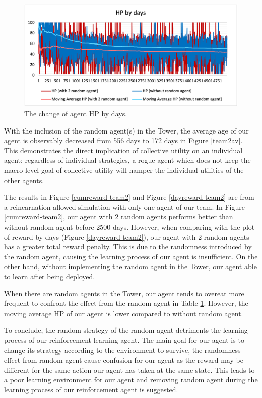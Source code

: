 \begin{figure}
\centering
\includegraphics{004_team_2_agent_design/hpchange}
\caption{The change of agent HP by days.}
\label{hpchange-team2}
\end{figure}

With the inclusion of the random agent(s) in the Tower, the average age of our agent is observably decreased from 556 days to 172 days in Figure \ref{team2av}. This demonstrates the direct implication of collective utility on an individual agent; regardless of individual strategies, a rogue agent which does not keep the macro-level goal of collective utility will hamper the individual utilities of the other agents. 

The results in Figure \ref{cumreward-team2} and Figure \ref{dayreward-team2} are from a reincarnation-allowed simulation with only one agent of our team. In Figure \ref{cumreward-team2}, our agent with 2 random agents performs better than without random agent before 2500 days. However, when comparing with the plot of reward by days (Figure \ref{dayreward-team2}), our agent with 2 random agents has a greater total reward penalty. This is due to the randomness introduced by the random agent, causing the learning process of our agent is insufficient. On the other hand, without implementing the random agent in the Tower, our agent able to learn after being deployed.

When there are random agents in the Tower, our agent tends to overeat more frequent to confront the effect from the random agent in Table \ref{hpchange-team2}. However, the moving average HP of our agent is lower compared to without random agent.

To conclude, the random strategy of the random agent detriments the learning process of our reinforcement learning agent. The main goal for our agent is to change its strategy according to the environment to survive, the randomness effect from random agent cause confusion for our agent as the reward may be different for the same action our agent has taken at the same state. This leads to a poor learning environment for our agent and removing random agent during the learning process of our reinforcement agent is suggested.

